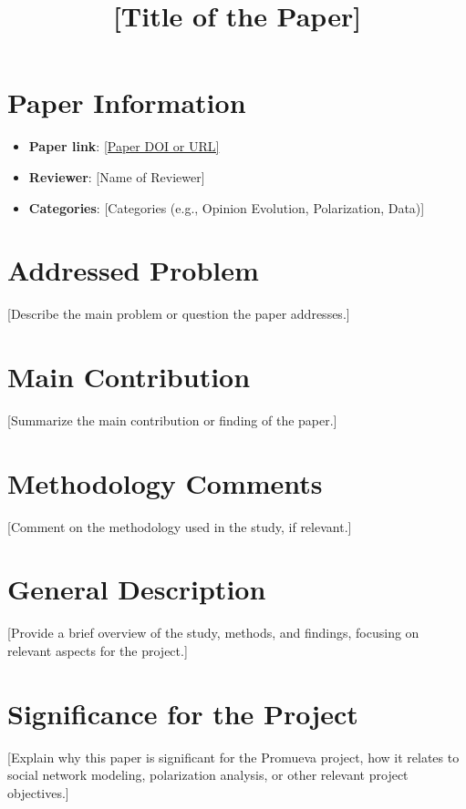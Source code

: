 \documentclass{article}
\title{[Title of the Paper]}
\author{}
\date{}
\begin{document}
\maketitle

\section*{Paper Information}
\begin{itemize}
    \item \textbf{Paper link}: \url{[Paper DOI or URL]}
    \item \textbf{Reviewer}: [Name of Reviewer]
    \item \textbf{Categories}: [Categories (e.g., Opinion Evolution, Polarization, Data)]
\end{itemize}

\section*{Addressed Problem}
[Describe the main problem or question the paper addresses.]

\section*{Main Contribution}
[Summarize the main contribution or finding of the paper.]

\section*{Methodology Comments}
[Comment on the methodology used in the study, if relevant.]

\section*{General Description}
[Provide a brief overview of the study, methods, and findings, focusing on relevant aspects for the project.]

\section*{Significance for the Project}
[Explain why this paper is significant for the Promueva project, how it relates to social network modeling, polarization analysis, or other relevant project objectives.]
\end{document}
